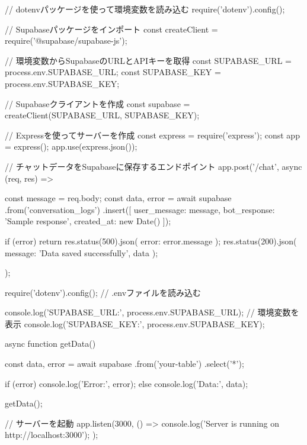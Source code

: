 // dotenvパッケージを使って環境変数を読み込む
require('dotenv').config();

// Supabaseパッケージをインポート
const { createClient } = require('@supabase/supabase-js');

// 環境変数からSupabaseのURLとAPIキーを取得
const SUPABASE_URL = process.env.SUPABASE_URL;
const SUPABASE_KEY = process.env.SUPABASE_KEY;

// Supabaseクライアントを作成
const supabase = createClient(SUPABASE_URL, SUPABASE_KEY);

// Expressを使ってサーバーを作成
const express = require('express');
const app = express();
app.use(express.json());

// チャットデータをSupabaseに保存するエンドポイント
app.post('/chat', async (req, res) => {
  const { message } = req.body;
  const { data, error } = await supabase
    .from('conversation_logs')
    .insert([{ user_message: message, bot_response: 'Sample response', created_at: new Date() }]);

  if (error) {
    return res.status(500).json({ error: error.message });
  }
  res.status(200).json({ message: 'Data saved successfully', data });
});

require('dotenv').config();  // .envファイルを読み込む

console.log('SUPABASE_URL:', process.env.SUPABASE_URL);  // 環境変数を表示
console.log('SUPABASE_KEY:', process.env.SUPABASE_KEY);

async function getData() {
    const { data, error } = await supabase
        .from('your-table')
        .select('*');
    
    if (error) {
        console.log('Error:', error);
    } else {
        console.log('Data:', data);
    }
}

getData();


// サーバーを起動
app.listen(3000, () => {
  console.log('Server is running on http://localhost:3000');
});
